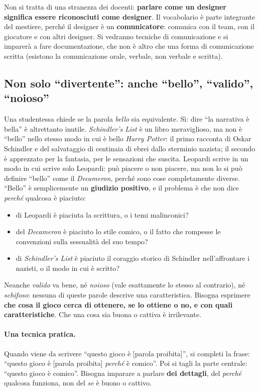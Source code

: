 Non si tratta di una stranezza dei docenti: \textbf{parlare come un designer
significa essere riconosciuti come designer}. Il vocabolario è parte integrante
del mestiere, perché il designer è un \textbf{comunicatore}: comunica con il
team, con il giocatore e con altri designer. Si vedranno tecniche di
comunicazione e si imparerà a fare documentazione, che non è altro che una
forma di comunicazione scritta (esistono la comunicazione orale, verbale, non
verbale e scritta).

\subsection{Non solo ``divertente'': anche ``bello'', ``valido'', ``noioso''}

Una studentessa chiede se la parola \emph{bello} sia equivalente. Sì: dire ``la
narrativa è bella'' è altrettanto inutile. \emph{Schindler's List} è un libro
meraviglioso, ma non è ``bello'' nello stesso modo in cui è bello \emph{Harry
Potter}: il primo racconta di Oskar Schindler e del salvataggio di centinaia di
ebrei dallo sterminio nazista; il secondo è apprezzato per la fantasia, per le
sensazioni che suscita. Leopardi scrive in un modo in cui scrive solo Leopardi:
può piacere o non piacere, ma non lo si può definire ``bello'' come il
\emph{Decameron}, perché sono cose completamente diverse. ``Bello'' è
semplicemente un \textbf{giudizio positivo}, e il problema è che non dice
\emph{perché} qualcosa è piaciuto:
\begin{itemize}
  \item di Leopardi è piaciuta la scrittura, o i temi malinconici?
  \item del \emph{Decameron} è piaciuto lo stile comico, o il fatto che
        rompesse le convenzioni sulla sessualità del suo tempo?
  \item di \emph{Schindler's List} è piaciuto il coraggio storico di Schindler
        nell'affrontare i nazisti, o il modo in cui è scritto?
\end{itemize}

Neanche \emph{valido} va bene, né \emph{noioso} (vale esattamente lo stesso al
contrario), né \emph{schifoso}: nessuna di queste parole descrive una
caratteristica. Bisogna esprimere \textbf{che cosa il gioco cerca di ottenere,
se lo ottiene o no, e con quali caratteristiche}. Che una cosa sia buona o
cattiva è irrilevante.

\paragraph{Una tecnica pratica.} Quando viene da scrivere ``questo gioco è
[parola proibita]'', si completi la frase: ``questo gioco è [parola
proibita] \emph{perché} è comico''. Poi si tagli la parte centrale: ``questo
gioco è comico''. Bisogna imparare a parlare \textbf{dei dettagli}, del
\emph{perché} qualcosa funziona, non del \emph{se} è buono o cattivo.

